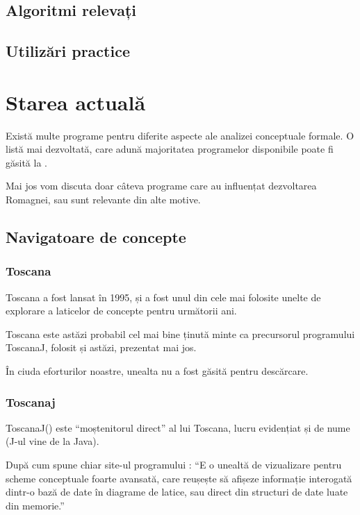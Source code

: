 \documentclass[12pt, a4paper, twoside, romanian]{teza-upb}
\begin{document}
  \section{Algoritmi relevați}

  \section{Utilizări practice}

\chapter{Starea actuală}

  Există multe programe pentru diferite aspecte ale analizei conceptuale formale. O listă mai dezvoltată, care adună majoritatea programelor disponibile poate fi găsită la \cite{utapriss:software}.

  Mai jos vom discuta doar câteva programe care au influențat dezvoltarea Romagnei, sau sunt relevante din alte motive.
  \section{Navigatoare de concepte}
    \subsection{Toscana}
      Toscana\cite{Vogt:1995:Toscana} a fost lansat în 1995, și a fost unul din cele mai folosite unelte de explorare a laticelor de concepte pentru următorii ani.

      Toscana este astăzi probabil cel mai bine ținută minte ca precursorul programului ToscanaJ, folosit și astăzi, prezentat mai jos.

      În ciuda eforturilor noastre, unealta nu a fost găsită pentru descărcare.

    \subsection{Toscanaj}
      ToscanaJ(\cite{Toscanaj:homepage}) este ``moștenitorul direct'' al lui Toscana, lucru evidențiat și de nume (J-ul vine de la Java).

      După cum spune chiar site-ul programului \cite{Toscanaj:toscanaj}: ``E o unealtă de vizualizare pentru scheme conceptuale foarte avansată, care reușește să afișeze informație interogată dintr-o bază de date în diagrame de latice, sau direct din structuri de date luate din memorie.''
\end{document}
